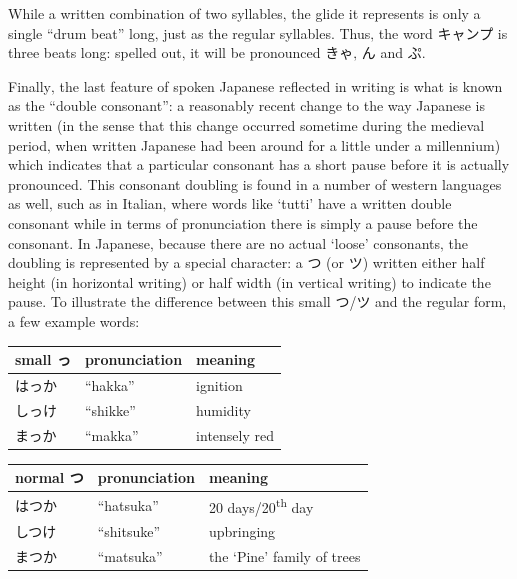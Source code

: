 \documentclass[11pt, b5paper, twoside, openright, onecolumn]{book}
\newenvironment{mytabular}[1]{\noindent\hspace{0.4in}
\begin{tabular}[h]{#1}}{\end{tabular}}
\begin{document}
While a written combination of two syllables‚ the glide it represents is only a single “drum beat” long‚ just as the regular syllables. Thus‚ the word キャンプ is three beats long: spelled out‚ it will be pronounced きゃ‚ ん and ぷ.

Finally‚ the last feature of spoken Japanese reflected in writing is what is known as the “double consonant”: a reasonably recent change to the way Japanese is written (in the sense that this change occurred sometime during the medieval period‚ when written Japanese had been around for a little under a millennium) which indicates that a particular consonant has a short pause before it is actually pronounced. This consonant doubling is found in a number of western languages as well‚ such as in Italian‚ where words like ‘tutti’ have a written double consonant while in terms of pronunciation there is simply a pause before the consonant. In Japanese‚ because there are no actual ‘loose’ consonants‚ the doubling is represented by a special character: a つ (or ツ) written either half height (in horizontal writing) or half width (in vertical writing) to indicate the pause. To illustrate the difference between this small つ/ツ and the regular form‚ a few example words:

\vspace{0.5cm}
\smaller
\begin{mytabular}{| l  l  l |}\hline 
\rule{0pt}{2.4ex}small っ & pronunciation & meaning\\ 
\hline
\rule{0pt}{2.4ex}はっか & “hakka” & ignition\\ 
\rule{0pt}{2.4ex}しっけ & “shikke” & humidity\\ 
\rule{0pt}{2.4ex}まっか & “makka” & intensely red\\ 
\hline 
\end{mytabular}
\larger
\vspace{0.5cm}

\smaller
\begin{mytabular}{| l  l  l |}\hline 
\rule{0pt}{2.4ex}normal つ & pronunciation & meaning\\ 
\hline
\rule{0pt}{2.4ex}はつか & “hatsuka” & 20 days/20\textsuperscript{th} day\\ 
\rule{0pt}{2.4ex}しつけ & “shitsuke” & upbringing\\ 
\rule{0pt}{2.4ex}まつか & “matsuka” & the ‘Pine’ family of trees\\ 
\hline 
\end{mytabular}
\larger
\vspace{0.5cm}
\end{document}
